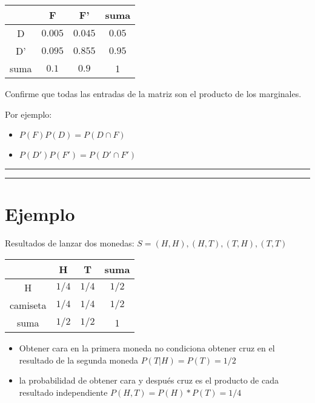 \documentclass[
]{book}
\providecommand{\tightlist}{%
  \setlength{\itemsep}{0pt}\setlength{\parskip}{0pt}}
\begin{document}
\begin{longtable}[]{@{}cccc@{}}
\toprule
& F & F' & suma \\
\midrule
\endhead
D & \(0.005\) & \(0.045\) & \(0.05\) \\
D' & \(0.095\) & \(0.855\) & \(0.95\) \\
suma & \(0.1\) & \(0.9\) & 1 \\
\bottomrule
\end{longtable}

Confirme que todas las entradas de la matriz son el producto de los marginales.

Por ejemplo:

\begin{itemize}
\tightlist
\item
  \(P(F)P(D)= P(D \cap F)\)
\item
  \(P(D')P(F')=P(D' \cap F')\)
\end{itemize}

\begin{center}\rule{0.5\linewidth}{0.5pt}\end{center}

\begin{center}\rule{0.5\linewidth}{0.5pt}\end{center}

\hypertarget{ejemplo-5}{%
\section{Ejemplo}\label{ejemplo-5}}

Resultados de lanzar dos monedas: \(S={(H,H), (H,T), (T,H), (T,T)}\)

\begin{longtable}[]{@{}cccc@{}}
\toprule
& H & T & suma \\
\midrule
\endhead
H & \(1/4\) & \(1/4\) & \(1/2\) \\
camiseta & \(1/4\) & \(1/4\) & \(1/2\) \\
suma & \(1/2\) & \(1/2\) & 1 \\
\bottomrule
\end{longtable}

\begin{itemize}
\tightlist
\item
  Obtener cara en la primera moneda no condiciona obtener cruz en el resultado de la segunda moneda \(P(T|H)=P(T)=1/2\)
\item
  la probabilidad de obtener cara y después cruz es el producto de cada resultado independiente \(P(H, T)=P(H)*P(T)=1/4\)
\end{itemize}
\end{document}
